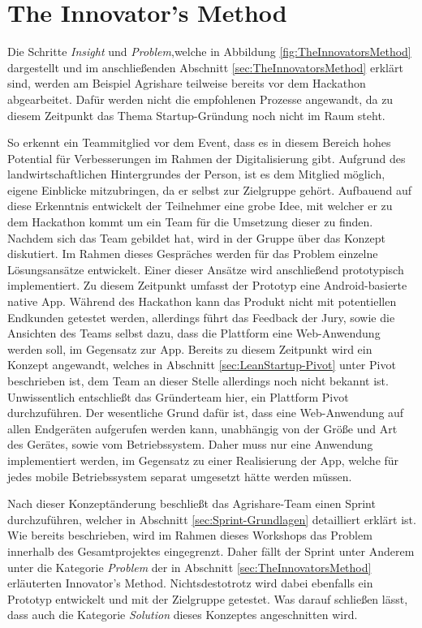 \section{The Innovator's Method}
Die Schritte \textit{Insight} und \textit{Problem},welche in Abbildung \ref{fig:TheInnovatorsMethod} dargestellt und im anschließenden Abschnitt \ref{sec:TheInnovatorsMethod} erklärt sind, werden am Beispiel Agrishare teilweise bereits vor dem Hackathon abgearbeitet. Dafür werden nicht die empfohlenen Prozesse angewandt, da zu diesem Zeitpunkt das Thema Startup-Gründung noch nicht im Raum steht.

So erkennt ein Teammitglied vor dem Event, dass es in diesem Bereich hohes Potential für Verbesserungen im Rahmen der Digitalisierung gibt. Aufgrund des landwirtschaftlichen Hintergrundes der Person, ist es dem Mitglied möglich, eigene Einblicke mitzubringen, da er selbst zur Zielgruppe gehört. Aufbauend auf diese Erkenntnis entwickelt der Teilnehmer eine grobe Idee, mit welcher er zu dem Hackathon kommt um ein Team für die Umsetzung dieser zu finden. Nachdem sich das Team gebildet hat, wird in der Gruppe über das Konzept diskutiert. Im Rahmen dieses Gespräches werden für das Problem einzelne Lösungsansätze entwickelt. Einer dieser Ansätze wird anschließend prototypisch implementiert. Zu diesem Zeitpunkt umfasst der Prototyp eine Android-basierte native App. Während des Hackathon kann das Produkt nicht mit potentiellen Endkunden getestet werden, allerdings führt das Feedback der Jury, sowie die Ansichten des Teams selbst dazu, dass die Plattform eine Web-Anwendung werden soll, im Gegensatz zur App. Bereits zu diesem Zeitpunkt wird ein Konzept angewandt, welches in Abschnitt \ref{sec:LeanStartup-Pivot} unter Pivot beschrieben ist, dem Team an dieser Stelle allerdings noch nicht bekannt ist. Unwissentlich entschließt das Gründerteam hier, ein Plattform Pivot durchzuführen. Der wesentliche Grund dafür ist, dass eine Web-Anwendung auf allen Endgeräten aufgerufen werden kann, unabhängig von der Größe und Art des Gerätes, sowie vom Betriebssystem. Daher muss nur eine Anwendung implementiert werden, im Gegensatz zu einer Realisierung der App, welche für jedes mobile Betriebssystem separat umgesetzt hätte werden müssen.

Nach dieser Konzeptänderung beschließt das Agrishare-Team einen Sprint durchzuführen, welcher in Abschnitt \ref{sec:Sprint-Grundlagen} detailliert erklärt ist. Wie bereits beschrieben, wird im Rahmen dieses Workshops das Problem innerhalb des Gesamtprojektes eingegrenzt. Daher fällt der Sprint unter Anderem unter die Kategorie \textit{Problem} der in Abschnitt \ref{sec:TheInnovatorsMethod} erläuterten Innovator's Method. Nichtsdestotrotz wird dabei ebenfalls ein Prototyp entwickelt und mit der Zielgruppe getestet. Was darauf schließen lässt, dass auch die Kategorie \textit{Solution} dieses Konzeptes angeschnitten wird.